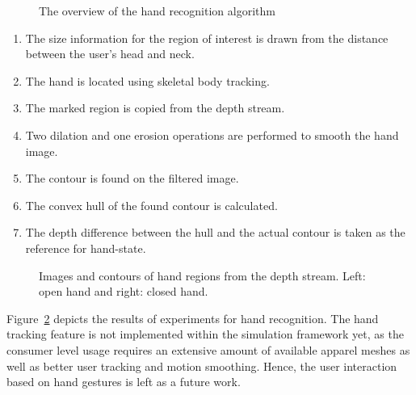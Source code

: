 \begin{figure}[h]
\centerline{}
\caption{The overview of the hand recognition algorithm}
\label{fig:hand_recognition_cycle}
\end{figure} 

\begin{enumerate}
\item The size information for the region of interest is drawn from the distance between the user's head and neck.
\item The hand is located using skeletal body tracking.
\item The marked region is copied from the depth stream. 
\item Two dilation and one erosion operations are performed to smooth the hand image.
\item The contour is found on the filtered image.
\item The convex hull of the found contour is calculated.
\item The depth difference between the hull and the actual contour is taken as the reference for hand-state.
\end{enumerate}

\begin{figure}[h]
\centerline{}
\caption{Images and contours of hand regions from the depth stream. Left: open hand and right: closed hand.}
\label{fig:open_closed_hands}
\end{figure}

Figure~\ref{fig:open_closed_hands} depicts the results of experiments for hand recognition. The hand tracking feature is not implemented within the simulation framework yet, as the consumer level usage requires an extensive amount of available apparel meshes as well as better user tracking and motion smoothing. Hence, the user interaction based on hand gestures is left as a future work.

